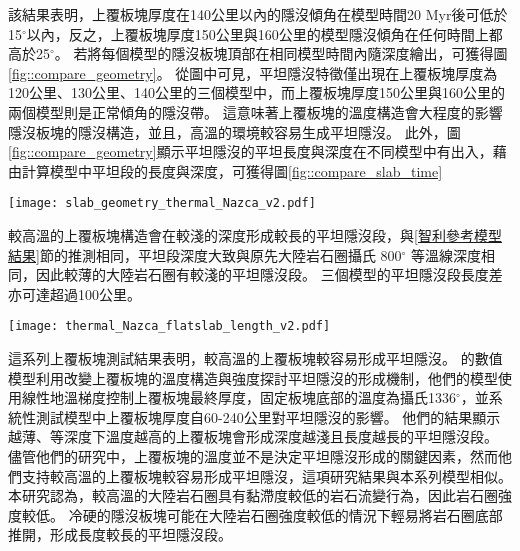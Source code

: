 該結果表明，上覆板塊厚度在140公里以內的隱沒傾角在模型時間20 Myr後可低於15$^\circ$以內，反之，上覆板塊厚度150公里與160公里的模型隱沒傾角在任何時間上都高於25$^\circ$。
若將每個模型的隱沒板塊頂部在相同模型時間內隨深度繪出，可獲得圖\ref{fig::compare_geometry}。
從圖中可見，平坦隱沒特徵僅出現在上覆板塊厚度為120公里、130公里、140公里的三個模型中，而上覆板塊厚度150公里與160公里的兩個模型則是正常傾角的隱沒帶。
這意味著上覆板塊的溫度構造會大程度的影響隱沒板塊的隱沒構造，並且，高溫的環境較容易生成平坦隱沒。
此外，圖\ref{fig::compare_geometry}顯示平坦隱沒的平坦長度與深度在不同模型中有出入，藉由計算模型中平坦段的長度與深度，可獲得圖\ref{fig::compare_slab_time}

\begin{figure*}[ht!]
    \centering
    \texttt{[image: slab\_geometry\_thermal\_Nazca\_v2.pdf]}
    \caption[測試上覆板塊厚度模型在40 Myr的隱沒板塊構造]{測試上覆板塊厚度模型在40 Myr時隱沒板塊於150公里以上之構造，幾何形狀取自隱沒板塊頂部，使用5公里移動平均平滑離散化的網格，模型與圖\ref{fig::compare_dip_thermal}所使用的圖例相同。}
    \label{fig::compare_geometry}
\end{figure*}

較高溫的上覆板塊構造會在較淺的深度形成較長的平坦隱沒段，與\ref{智利參考模型結果}節的推測相同，平坦段深度大致與原先大陸岩石圈攝氏 800$^\circ$ 等溫線深度相同，因此較薄的大陸岩石圈有較淺的平坦隱沒段。
三個模型的平坦隱沒段長度差亦可達超過100公里。

\begin{figure*}[ht!]
    \centering
    \texttt{[image: thermal\_Nazca\_flatslab\_length\_v2.pdf]}
    \caption[測試上覆板塊厚度模型的平坦段長度與深度]{測試上覆板塊厚度模型的平坦段(a)長度與(b)深度。模型與圖\ref{fig::compare_dip_thermal}所使用的圖例相同。}
    \label{fig::compare_slab_time}
\end{figure*}

這系列上覆板塊測試結果表明，較高溫的上覆板塊較容易形成平坦隱沒。
\citealp{liu2019influence}的數值模型利用改變上覆板塊的溫度構造與強度探討平坦隱沒的形成機制，他們的模型使用線性地溫梯度控制上覆板塊最終厚度，固定板塊底部的溫度為攝氏1336$^\circ$，並系統性測試模型中上覆板塊厚度自60-240公里對平坦隱沒的影響。
他們的結果顯示越薄、等深度下溫度越高的上覆板塊會形成深度越淺且長度越長的平坦隱沒段。
儘管他們的研究中，上覆板塊的溫度並不是決定平坦隱沒形成的關鍵因素，然而他們支持較高溫的上覆板塊較容易形成平坦隱沒，這項研究結果與本系列模型相似。
本研究認為，較高溫的大陸岩石圈具有黏滯度較低的岩石流變行為，因此岩石圈強度較低。
冷硬的隱沒板塊可能在大陸岩石圈強度較低的情況下輕易將岩石圈底部推開，形成長度較長的平坦隱沒段。

